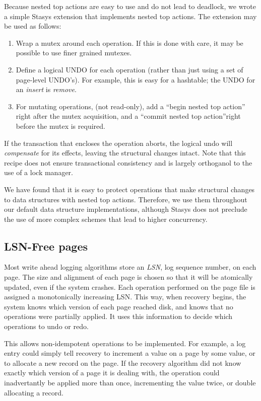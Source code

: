 \documentclass[letterpaper,twocolumn,10pt]{article}
\newcommand{\yad}{Stasys\xspace}
\begin{document}
Because nested top actions are easy to use and do not lead to 
deadlock, we wrote a simple \yad extension that
implements nested top actions.  The extension may be used as follows:

\begin{enumerate}
\item Wrap a mutex around each operation.  If this is done with care,
  it may be possible to use finer grained mutexes.
\item Define a logical UNDO for each operation (rather than just using
  a set of page-level UNDO's).  For example, this is easy for a
  hashtable; the UNDO for an {\em insert} is {\em remove}.
\item For mutating operations, (not read-only), add a ``begin nested
  top action'' right after the mutex acquisition, and a ``commit
  nested top action''right before the mutex is required.
\end{enumerate}

If the transaction that encloses the operation aborts, the logical
undo will {\em compensate} for its effects, leaving the structural
changes intact.  Note that this recipe does not ensure transactional
consistency and is largely orthoganol to the use of a lock manager.

We have found that it is easy to protect operations that make
structural changes to data structures with nested top actions.  Therefore, we use
them throughout our default data structure implementations, although
\yad does not preclude the use of more complex schemes that lead to
higher concurrency.


\subsection{LSN-Free pages}

Most write ahead logging algorithms store an {\em LSN}, log sequence
number, on each page.  The size and alignment of each page is chosen
so that it will be atomically updated, even if the system crashes.
Each operation performed on the page file is assigned a monotonically
increasing LSN.  This way, when recovery begins, the system knows
which version of each page reached disk, and knows that no operations 
were partially applied. It uses this information to decide which operations to undo or redo.

This allows non-idempotent operations to be implemented.  For
example, a log entry could simply tell recovery to increment a value
on a page by some value, or to allocate a new record on the page.  
If the recovery algorithm did not know exactly which
version of a page it is dealing with, the operation could
inadvertantly be applied more than once, incrementing the value twice,
or double allocating a record.
\end{document}
